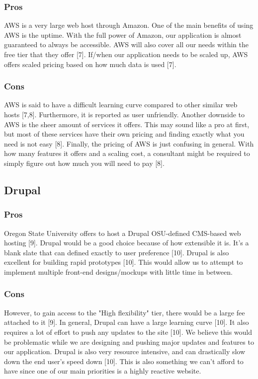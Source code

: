 \documentclass[onecolumn, draftclsnofoot,10pt, compsoc]{IEEEtran}
\begin{document}
		\subsubsection{Pros}
	AWS is a very large web host through Amazon. One of the main benefits of using AWS is the uptime. With the full power of Amazon, our application is almost guaranteed to always be accessible. AWS will also cover all our needs within the free tier that they offer [7]. If/when our application needs to be scaled up, AWS offers scaled pricing based on how much data is used [7].
    \subsubsection{Cons}
	AWS is said to have a difficult learning curve compared to other similar web hosts [7,8]. Furthermore, it is reported as user unfriendly. Another downside to AWS is the sheer amount of services it offers. This may sound like a pro at first, but most of these services have their own pricing and finding exactly what you need is not easy [8]. Finally, the pricing of AWS is just confusing in general. With how many features it offers and a scaling cost, a consultant might be required to simply figure out how much you will need to pay [8].
	\subsection{Drupal}
	
		\subsubsection{Pros}
	Oregon State University offers to host a Drupal OSU-defined CMS-based web hosting [9]. Drupal would be a good choice because of how extensible it is. It’s a blank slate that can defined exactly to user preference [10]. Drupal is also excellent for building rapid prototypes [10]. This would allow us to attempt to implement multiple front-end designs/mockups with little time in between.
    \subsubsection{Cons}
    However, to gain access to the "High flexibility" tier, there would be a large fee attached to it [9]. In general, Drupal can have a large learning curve [10]. It also requires a lot of effort to push any updates to the site [10]. We believe this would be problematic while we are designing and pushing major updates and features to our application. Drupal is also very resource intensive, and can drastically slow down the end user’s speed down [10]. This is also something we can’t afford to have since one of our main priorities is a highly reactive website.
\end{document}

